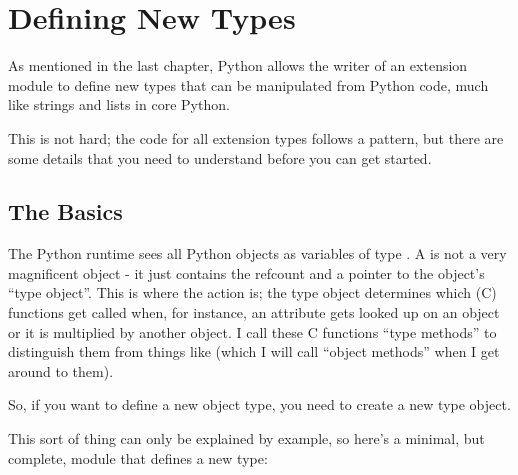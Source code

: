 \chapter{Defining New Types
        \label{defining-new-types}}

As mentioned in the last chapter, Python allows the writer of an
extension module to define new types that can be manipulated from
Python code, much like strings and lists in core Python.

This is not hard; the code for all extension types follows a pattern,
but there are some details that you need to understand before you can
get started.

\section{The Basics
    \label{dnt-basics}}

The Python runtime sees all Python objects as variables of type
.  A  is not a very magnificent
object - it just contains the refcount and a pointer to the object's
``type object''.  This is where the action is; the type object
determines which (C) functions get called when, for instance, an
attribute gets looked up on an object or it is multiplied by another
object.  I call these C functions ``type methods'' to distinguish them
from things like  (which I will call ``object
methods'' when I get around to them).

So, if you want to define a new object type, you need to create a new
type object.

This sort of thing can only be explained by example, so here's a
minimal, but complete, module that defines a new type:

